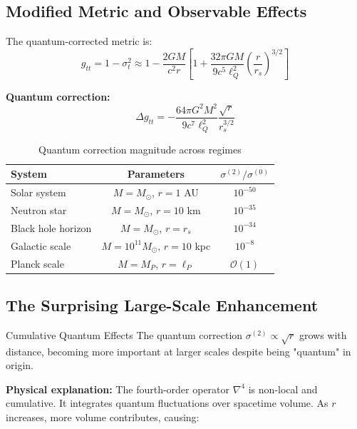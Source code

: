 \documentclass[11pt,a4paper]{article}
\theoremstyle{definition}
\theoremstyle{remark}
\begin{document}
	\subsection{Modified Metric and Observable Effects}
	
	The quantum-corrected metric is:
	\begin{equation}
		g_{tt} = 1 - \sigma_t^2 \approx 1 - \frac{2GM}{c^2r}\left[1 + \frac{32\pi GM}{9c^5\ell_Q^2}\left(\frac{r}{r_s}\right)^{3/2}\right]
	\end{equation}
	
	\textbf{Quantum correction:}
	\begin{equation}\label{eq:metric_correction}
		\boxed{\Delta g_{tt} = -\frac{64\pi G^2M^2}{9c^7\ell_Q^2}\frac{\sqrt{r}}{r_s^{3/2}}}
	\end{equation}
	
	\begin{table}[h]
		\centering
		\caption{Quantum correction magnitude across regimes}
		\begin{tabular}{@{}lcc@{}}
			\toprule
			\textbf{System} & \textbf{Parameters} & $\sigma^{(2)}/\sigma^{(0)}$ \\
			\midrule
			Solar system & $M = M_\odot$, $r = 1$ AU & $10^{-50}$ \\
			Neutron star & $M = M_\odot$, $r = 10$ km & $10^{-35}$ \\
			Black hole horizon & $M = M_\odot$, $r = r_s$ & $10^{-34}$ \\
			Galactic scale & $M = 10^{11}M_\odot$, $r = 10$ kpc & $10^{-8}$ \\
			Planck scale & $M = M_P$, $r = \ell_P$ & $\mathcal{O}(1)$ \\
			\bottomrule
		\end{tabular}
	\end{table}
	
	\subsection{The Surprising Large-Scale Enhancement}
	
	Cumulative Quantum Effects
		The quantum correction $\sigma^{(2)} \propto \sqrt{r}$ grows with distance, becoming more important at larger scales despite being "quantum" in origin.
	
	\textbf{Physical explanation:} The fourth-order operator $\nabla^4$ is non-local and cumulative. It integrates quantum fluctuations over spacetime volume. As $r$ increases, more volume contributes, causing:
	
\end{document}
